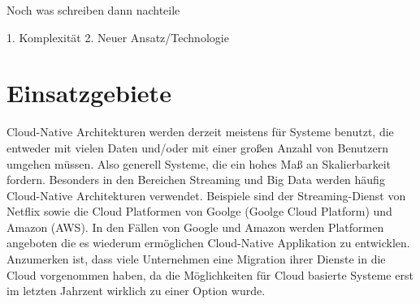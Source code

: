 Noch was schreiben dann nachteile

1. Komplexität
2. Neuer Ansatz/Technologie


\section{Einsatzgebiete}
Cloud-Native Architekturen werden derzeit meistens für Systeme benutzt, die entweder mit vielen Daten und/oder mit einer großen Anzahl von Benutzern umgehen müssen. Also generell Systeme, die ein hohes Maß an Skalierbarkeit fordern. Besonders in den Bereichen Streaming und Big Data werden häufig Cloud-Native Architekturen verwendet. 
Beispiele sind der Streaming-Dienst von Netflix sowie die Cloud Platformen von Goolge (Goolge Cloud Platform) und Amazon (AWS). In den Fällen von Google und Amazon werden Platformen angeboten die es wiederum ermöglichen Cloud-Native Applikation zu entwicklen.
Anzumerken ist, dass viele Unternehmen eine Migration ihrer Dienste in die Cloud vorgenommen haben, da die Möglichkeiten für Cloud basierte Systeme erst im letzten Jahrzent wirklich zu einer Option wurde. 